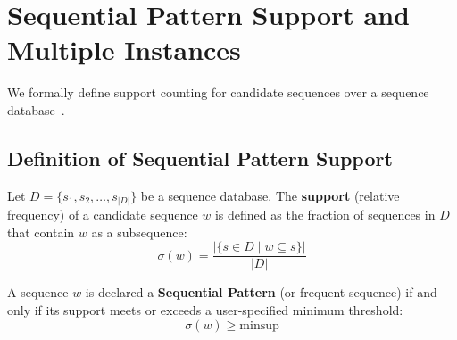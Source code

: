 \section{Sequential Pattern Support and Multiple Instances}
\label{sec:dm-seq-patterns-instances}

We formally define support counting for candidate sequences over a sequence database~\cite{tan2018, agrawal1995}.

\subsection{Definition of Sequential Pattern Support}
\begin{definition}
Let $D = \{s_1, s_2, \dots, s_{|D|}\}$ be a sequence database. The \textbf{support} (relative frequency) of a candidate sequence $w$ is defined as the fraction of sequences in $D$ that contain $w$ as a subsequence:
\begin{equation}
\label{eq:seq-support-definition-en}
\sigma(w) = \frac{\big| \{ s \in D \mid w \subseteq s \} \big|}{|D|}
\end{equation}
\end{definition}

\begin{definition}
A sequence $w$ is declared a \textbf{Sequential Pattern} (or frequent sequence) if and only if its support meets or exceeds a user-specified minimum threshold:
\begin{equation}
\sigma(w) \ge \text{minsup}
\end{equation}
\end{definition}

